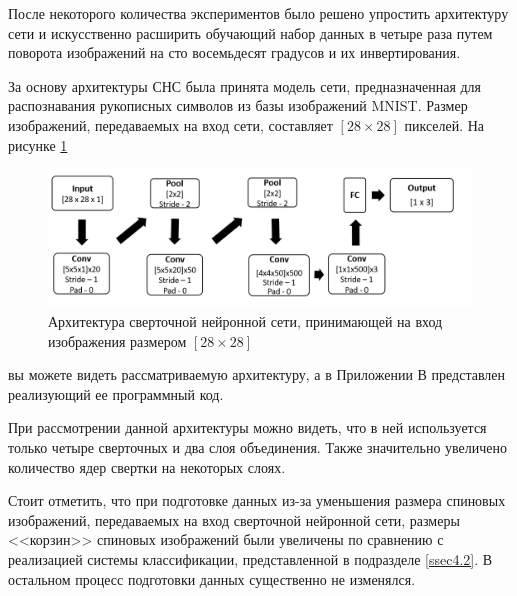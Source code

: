 \documentclass[14pt]{article}
\numberwithin{figure}{section}
\numberwithin{equation}{section}
\begin{document}
После некоторого количества экспериментов было решено упростить архитектуру сети и искусственно расширить обучающий набор данных в четыре раза путем поворота изображений на сто восемьдесят градусов и их инвертирования.

За основу архитектуры СНС была принята модель сети, предназначенная для распознавания рукописных символов из базы изображений MNIST. Размер изображений, передаваемых на вход сети, составляет $[28 \times 28]$ пикселей. На рисунке \ref{ris:11}
\begin{figure}[h]
   \begin{center}
       \includegraphics[scale=0.73] {11.JPG}
       \caption{Архитектура сверточной нейронной сети, принимающей на вход изображения размером $[28 \times 28]$}
       \label{ris:11}
   \end{center}
\end{figure}
 вы можете видеть рассматриваемую архитектуру, а в Приложении В представлен реализующий ее программный код.

При рассмотрении данной архитектуры можно видеть, что в ней используется только четыре сверточных и два слоя объединения. Также значительно увеличено количество ядер свертки на некоторых слоях.

Стоит отметить, что при подготовке данных из-за уменьшения размера спиновых изображений, передаваемых на вход сверточной нейронной сети, размеры <<корзин>> спиновых изображений были увеличены по сравнению с реализацией системы классификации, представленной в подразделе \ref{ssec4.2}. В остальном процесс подготовки данных существенно не изменялся.
\end{document}
